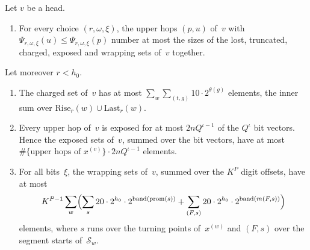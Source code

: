 \begin{lemma}\label{lem:hopterms}
Let $v$ be a head.
\begin{enumerate}[label=(\alph*)]
\item For every choice $(r,\omega,\xi)$, the upper hops $(p,u)$ of~$v$ with $\Psi_{r,\omega,\xi}(u)\le\Psi_{r,\omega,\xi}(p)$ number at
most the sizes of the lost, truncated, charged, exposed and wrapping sets of~$v$ together.
\end{enumerate}
Let moreover $r<h_0$.
\begin{enumerate}[label=(\alph*),resume]
\item The charged set of~$v$ has at most $\sum_w\sum_{(t,g)}10\cdot2^{\theta(g)}$ elements, the inner sum over
$\mathrm{Rise}_r(w)\cup\mathrm{Last}_r(w)$.
\item Every upper hop of~$v$ is exposed for at most $2nQ^{\iota-1}$ of the $Q^\iota$ bit vectors. Hence the exposed sets of~$v$,
summed over the bit vectors, have at most $\#\{\text{upper hops of }x^{(v)}\}\cdot2nQ^{\iota-1}$ elements.
\item For all bits~$\xi$, the wrapping sets of~$v$, summed over the $K^P$ digit offsets, have at most
\[
  K^{P-1}\sum_w\Bigl(\sum_s20\cdot2^{h_0}\cdot2^{\operatorname{band}(\operatorname{prom}(s))}+\sum_{(F,s)}20\cdot2^{h_0}\cdot2^{\operatorname{band}(m(F,s))}\Bigr)
\]
elements, where $s$ runs over the turning points of~$x^{(w)}$ and $(F,s)$ over the segment starts of~$\mathcal S_w$.
\end{enumerate}
\end{lemma}

